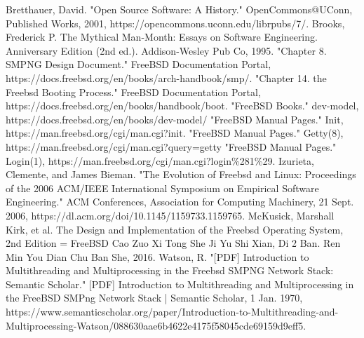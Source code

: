 \documentclass[12pt, dvipsnames, a4paper]{article}
\begin{document}
\begin{thebibliography}{00}
	Bretthauer, David. "Open Source Software: A History." OpenCommons@UConn, Published Works, 2001, https://opencommons.uconn.edu/librpubs/7/.
	 Brooks, Frederick P. The Mythical Man-Month: Essays on Software Engineering. Anniversary Edition (2nd ed.). Addison-Wesley Pub Co, 1995.
	 "Chapter 8. SMPNG Design Document." FreeBSD Documentation Portal, https://docs.freebsd.org/en/books/arch-handbook/smp/.
	 "Chapter 14. the Freebsd Booting Process." FreeBSD Documentation Portal, https://docs.freebsd.org/en/books/handbook/boot.
	 "FreeBSD Books." dev-model, https://docs.freebsd.org/en/books/dev-model/
	 "FreeBSD Manual Pages." Init, https://man.freebsd.org/cgi/man.cgi?init.
	 "FreeBSD Manual Pages." Getty(8), https://man.freebsd.org/cgi/man.cgi?query=getty
	 "FreeBSD Manual Pages." Login(1), https://man.freebsd.org/cgi/man.cgi?login\%281\%29.
	Izurieta, Clemente, and James Bieman. "The Evolution of Freebsd and Linux: Proceedings of the 2006 ACM/IEEE International Symposium on Empirical Software Engineering." ACM Conferences, Association for Computing Machinery, 21 Sept. 2006, https://dl.acm.org/doi/10.1145/1159733.1159765.
	 McKusick, Marshall Kirk, et al. The Design and Implementation of the Freebsd Operating System, 2nd Edition = FreeBSD Cao Zuo Xi Tong She Ji Yu Shi Xian, Di 2 Ban. Ren Min You Dian Chu Ban She, 2016.
	 Watson, R. "[PDF] Introduction to Multithreading and Multiprocessing in the Freebsd SMPNG Network Stack: Semantic Scholar." [PDF]  Introduction to Multithreading and Multiprocessing in the FreeBSD SMPng Network Stack | Semantic Scholar, 1 Jan. 1970, https://www.semanticscholar.org/paper/Introduction-to-Multithreading-and-Multiprocessing-Watson/088630aae6b4622e4175f58045cde69159d9eff5.
\end{thebibliography}
\end{document}
